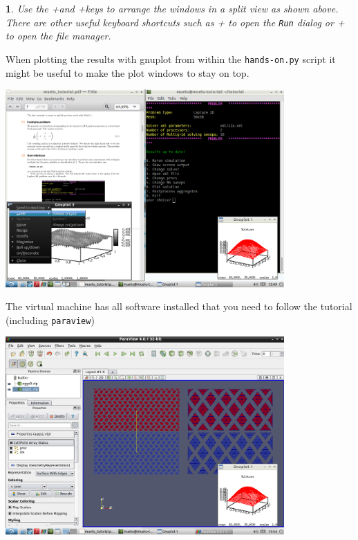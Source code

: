 \documentclass[10pt,fleqn]{book}
\newtheorem*{mycomment}{\ding{42}}
\begin{document}
\begin{mycomment}
Use the +\LArrow and +\RArrow keys to arrange the windows in a split view as shown above.
There are other useful keyboard shortcuts such as + to open the \verb|Run| dialog or + to open the file manager.
\end{mycomment}

When plotting the results with gnuplot from within the \verb|hands-on.py| script it might be useful to make the plot windows to stay on top.

\begin{center}\includegraphics[width=0.8\textwidth]{pics/lubuntu_5.png} \end{center}

The virtual machine has all software installed that you need to follow the tutorial (including \verb|paraview|)

\begin{center}\includegraphics[width=0.8\textwidth]{pics/lubuntu_6.png} \end{center}
\end{document}
